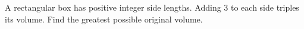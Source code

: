 A rectangular box has positive integer side lengths. Adding 3 to each side triples its volume. Find the greatest possible original volume.
